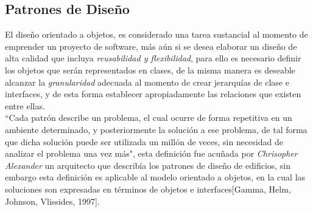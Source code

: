 \subsection {Patrones de Diseño}
\noindent El diseño orientado a objetos, es considerado una tarea sustancial al momento de emprender un proyecto de software,
\noindent más aún si se desea elaborar un diseño de alta calidad que incluya \textit{reusabilidad y flexibilidad}, para ello es necesario
\noindent definir los objetos que serán representados en clases, de la misma manera es deseable alcanzar la \textit{granularidad}
\noindent adecuada al momento de crear jerarquías de clase e interfaces, y de esta forma establecer apropiadamente las relaciones
\noindent que existen entre ellas.\\
\noindent ``Cada patrón describe un problema, el cual ocurre de forma repetitiva en un ambiente determinado, y posteriormente
\noindent la solución a ese problema, de tal forma que dicha solución puede ser utilizada un millón de veces, sin necesidad
\noindent de analizar el problema una vez más", esta definición fue acuñada por \textit{Chrisopher Alexander} un arquitecto
\noindent que describía los patrones de diseño de edificios, sin embargo esta definición es aplicable al modelo orientado a
\noindent objetos, en la cual las soluciones son expresadas en términos de objetos e interfaces[Gamma, Helm, Johnson, Vlissides, 1997].\\
